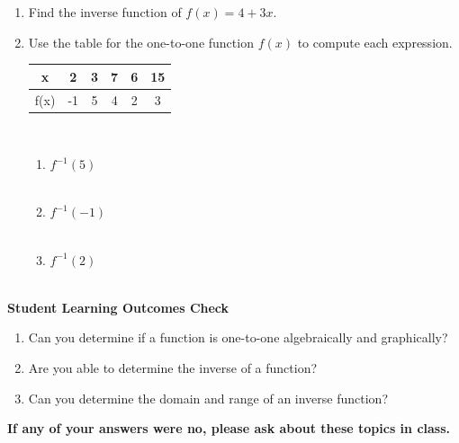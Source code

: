 \documentclass[11pt]{article}
\begin{document}
\begin{enumerate}
 
 \item Find the inverse function of $f(x) = 4 + 3x$. \\[1.2in]
 
 
 \vfill
 
  
\item Use the table for the one-to-one function $f(x)$ to compute each expression.\\[.2in]
\begin{tabular}{| c |  c | c | c | c | c | }
\hline x & 2 & 3&7 &6 & 15\\ \hline
f(x) &-1 &5 &4 &2 & 3\\ \hline
\end{tabular} 
\\
\begin{enumerate}
\item $f^{-1} (5)$ \\ \\
\item $f^{-1} (-1)$ \\ \\
\item $f^{-1} (2)$ \\ \\

\end{enumerate}




\end{enumerate}

\noindent \textbf{Student Learning Outcomes Check}

\begin{enumerate}
\item Can you determine if a function is one-to-one algebraically and graphically?
\item Are you able to determine the inverse of a function?
\item Can you determine the domain and range of an inverse function?

\end{enumerate}

\noindent \textbf{If any of your answers were no, please ask about these topics in class.}
\end{document}
